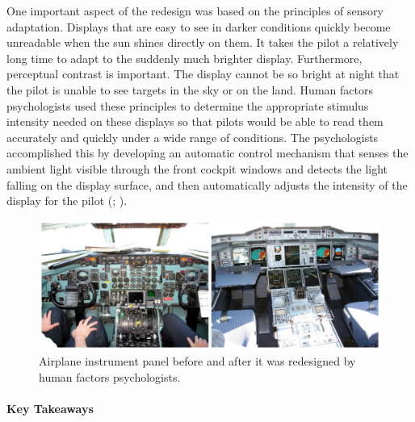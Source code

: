 \documentclass[
]{krantz}
\begin{document}
One important aspect of the redesign was based on the principles of sensory adaptation. Displays that are easy to see in darker conditions quickly become unreadable when the sun shines directly on them. It takes the pilot a relatively long time to adapt to the suddenly much brighter display. Furthermore, perceptual contrast is important. The display cannot be so bright at night that the pilot is unable to see targets in the sky or on the land. Human factors psychologists used these principles to determine the appropriate stimulus intensity needed on these displays so that pilots would be able to read them accurately and quickly under a wide range of conditions. The psychologists accomplished this by developing an automatic control mechanism that senses the ambient light visible through the front cockpit windows and detects the light falling on the display surface, and then automatically adjusts the intensity of the display for the pilot (; ).

\begin{figure}

{\centering \includegraphics[width=0.9\linewidth]{images/ch2/fig8} 

}

\caption{Airplane instrument panel before and after it was redesigned by human factors psychologists.}\label{fig:humanfactors}
\end{figure}

\paragraph*{Key Takeaways}\label{key-takeaways-1}
\end{document}
